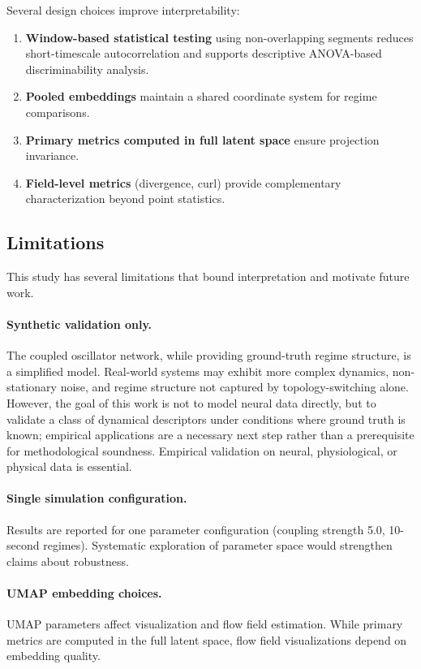 \documentclass[5p,twocolumn,authoryear]{elsarticle}
\begin{document}
Several design choices improve interpretability:
\begin{enumerate}
    \item \textbf{Window-based statistical testing} using non-overlapping segments reduces short-timescale autocorrelation and supports descriptive ANOVA-based discriminability analysis.
    \item \textbf{Pooled embeddings} maintain a shared coordinate system for regime comparisons.
    \item \textbf{Primary metrics computed in full latent space} ensure projection invariance.
    \item \textbf{Field-level metrics} (divergence, curl) provide complementary characterization beyond point statistics.
\end{enumerate}

\subsection{Limitations}
\label{sec:limitations}

This study has several limitations that bound interpretation and motivate future work.

\paragraph{Synthetic validation only.}
The coupled oscillator network, while providing ground-truth regime structure, is a simplified model. Real-world systems may exhibit more complex dynamics, non-stationary noise, and regime structure not captured by topology-switching alone. However, the goal of this work is not to model neural data directly, but to validate a class of dynamical descriptors under conditions where ground truth is known; empirical applications are a necessary next step rather than a prerequisite for methodological soundness. Empirical validation on neural, physiological, or physical data is essential.

\paragraph{Single simulation configuration.}
Results are reported for one parameter configuration (coupling strength 5.0, 10-second regimes). Systematic exploration of parameter space would strengthen claims about robustness.

\paragraph{UMAP embedding choices.}
UMAP parameters affect visualization and flow field estimation. While primary metrics are computed in the full latent space, flow field visualizations depend on embedding quality.
\end{document}
